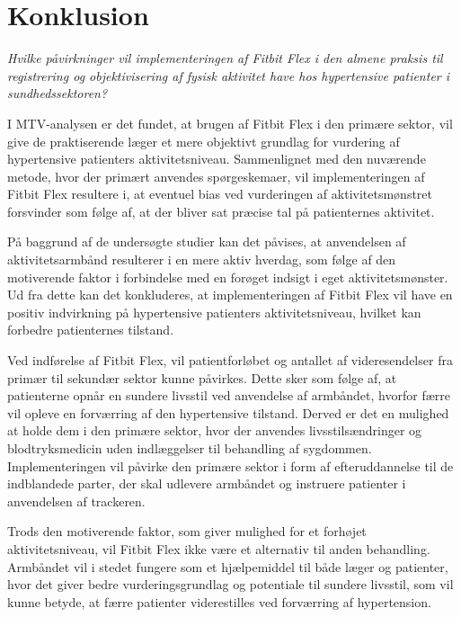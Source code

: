 \chapter{Konklusion}

\textit{Hvilke påvirkninger vil implementeringen af Fitbit Flex i den almene praksis til registrering og objektivisering af fysisk aktivitet have hos hypertensive patienter i sundhedssektoren?}

I MTV-analysen er det fundet, at brugen af Fitbit Flex i den primære sektor, vil give de praktiserende læger et mere objektivt grundlag for vurdering af hypertensive patienters aktivitetsniveau. Sammenlignet med den nuværende metode, hvor der primært anvendes spørgeskemaer, vil implementeringen af Fitbit Flex resultere i, at eventuel bias ved vurderingen af aktivitetsmønstret forsvinder som følge af, at der bliver sat præcise tal på patienternes aktivitet.

På baggrund af de undersøgte studier kan det påvises, at anvendelsen af aktivitetsarmbånd resulterer i en mere aktiv hverdag, som følge af den motiverende faktor i forbindelse med en forøget indsigt i eget aktivitetsmønster. Ud fra dette kan det konkluderes, at implementeringen af Fitbit Flex vil have en positiv indvirkning på hypertensive patienters aktivitetsniveau, hvilket kan forbedre patienternes tilstand.

Ved indførelse af Fitbit Flex, vil patientforløbet og antallet af videresendelser fra primær til sekundær sektor kunne påvirkes. Dette sker som følge af, at patienterne opnår en sundere livsstil ved anvendelse af armbåndet, hvorfor færre vil opleve en forværring af den hypertensive tilstand. Derved er det en mulighed at holde dem i den primære sektor, hvor der anvendes livsstilsændringer og blodtryksmedicin uden indlæggelser til behandling af sygdommen. Implementeringen vil påvirke den primære sektor i form af efteruddannelse til de indblandede parter, der skal udlevere armbåndet og instruere patienter i anvendelsen af trackeren.

Trods den motiverende faktor, som giver mulighed for et forhøjet aktivitetsniveau, vil Fitbit Flex ikke være et alternativ til anden behandling. Armbåndet vil i stedet fungere som et hjælpemiddel til både læger og patienter, hvor det giver bedre vurderingsgrundlag og potentiale til sundere livsstil, som vil kunne betyde, at færre patienter viderestilles ved forværring af hypertension.